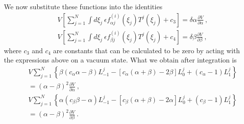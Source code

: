 \documentclass[a4paper,12pt]{article}
\begin{document}
We now substitute these functions into the identities \cite{3}
\begin{eqnarray}
 & & V\left[ \sum_{j=1}^N\int d\xi _j\ \epsilon f_{\alpha j}^{(i)}(\xi _j)T^j(\xi _j)+c_3\right] =\delta \alpha \frac{\partial V}{\partial \alpha }\ ,\\ 
 & & V\left[ \sum_{j=1}^N\int d\xi _j\ \epsilon f_{\beta j}^{(i)}(\xi _j)T^j(\xi _j)+c_4\right] =\delta \beta \frac{\partial V}{\partial \beta }\ ,
\end{eqnarray}
where $c_3$ and $c_4$ are constants that can be calculated to be zero by acting with the expressions above on a vacuum state. What we obtain after integration is
\begin{eqnarray}
 & & V\sum_{j=1}^N\left\{ \beta (c_\alpha \alpha -\beta )L_{-1}^j-\left[ c_\alpha (\alpha +\beta )-2\beta \right] L_0^j+(c_\alpha -1)L_1^j\right\} \nonumber \\ 
\label{eq28}
 & & =(\alpha -\beta )^2\frac{\partial V}{\partial \alpha }\ ,\\ 
 & & V\sum_{j=1}^N\left\{ \alpha (c_\beta \beta -\alpha )L_{-1}^j-\left[ c_\beta (\alpha +\beta )-2\alpha \right] L_0^j+(c_\beta -1)L_1^j\right\} \nonumber \\ 
\label{eq29}
 & & =(\alpha -\beta )^2\frac{\partial V}{\partial \beta }\ .
\end{eqnarray}
\end{document}

